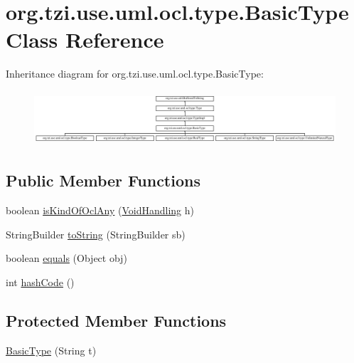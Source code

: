 \hypertarget{classorg_1_1tzi_1_1use_1_1uml_1_1ocl_1_1type_1_1_basic_type}{\section{org.\-tzi.\-use.\-uml.\-ocl.\-type.\-Basic\-Type Class Reference}
\label{classorg_1_1tzi_1_1use_1_1uml_1_1ocl_1_1type_1_1_basic_type}
}
Inheritance diagram for org.\-tzi.\-use.\-uml.\-ocl.\-type.\-Basic\-Type\-:\begin{figure}[H]
\begin{center}
\leavevmode
\includegraphics[height=2.043796cm]{classorg_1_1tzi_1_1use_1_1uml_1_1ocl_1_1type_1_1_basic_type}
\end{center}
\end{figure}
\subsection*{Public Member Functions}
\begin{DoxyCompactItemize}
\item 
boolean \hyperlink{classorg_1_1tzi_1_1use_1_1uml_1_1ocl_1_1type_1_1_basic_type_a70e10b9a6a16e228e1f88a71fffce691}{is\-Kind\-Of\-Ocl\-Any} (\hyperlink{enumorg_1_1tzi_1_1use_1_1uml_1_1ocl_1_1type_1_1_type_1_1_void_handling}{Void\-Handling} h)
\item 
String\-Builder \hyperlink{classorg_1_1tzi_1_1use_1_1uml_1_1ocl_1_1type_1_1_basic_type_a0e6e8ba09b5a19cc8690ba1147a4f3f1}{to\-String} (String\-Builder sb)
\item 
boolean \hyperlink{classorg_1_1tzi_1_1use_1_1uml_1_1ocl_1_1type_1_1_basic_type_a35c9572dfd18a14dd39b2e7ccd0a5ff0}{equals} (Object obj)
\item 
int \hyperlink{classorg_1_1tzi_1_1use_1_1uml_1_1ocl_1_1type_1_1_basic_type_a1d74296e5aa9d287fffb19b5f93a428a}{hash\-Code} ()
\end{DoxyCompactItemize}
\subsection*{Protected Member Functions}
\begin{DoxyCompactItemize}
\item 
\hyperlink{classorg_1_1tzi_1_1use_1_1uml_1_1ocl_1_1type_1_1_basic_type_a675859e79748fb70ec6f1f5383c7285f}{Basic\-Type} (String t)
\end{DoxyCompactItemize}



